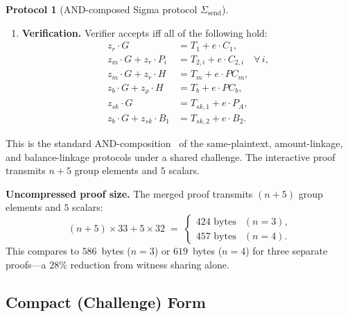 \documentclass[11pt]{article}
\theoremstyle{definition}
\newtheorem{protocol}[theorem]{Protocol}
\newcommand{\sk}{\mathit{sk}}
\begin{document}
\begin{protocol}[AND-composed Sigma protocol $\Sigma_{\mathrm{send}}$]
\begin{enumerate}
    \item \textbf{Verification.}
          Verifier accepts iff all of the following hold:
          \begin{align}
            z_r \cdot G
              &= T_1 + e \cdot C_1,
              \label{eq:ver-t1} \\
            z_m \cdot G + z_r \cdot P_i
              &= T_{2,i} + e \cdot C_{2,i}
              \quad \forall\, i,
              \label{eq:ver-t2} \\
            z_m \cdot G + z_r \cdot H
              &= T_m + e \cdot \mathit{PC}_m,
              \label{eq:ver-tm} \\
            z_b \cdot G + z_\rho \cdot H
              &= T_b + e \cdot \mathit{PC}_b,
              \label{eq:ver-tb} \\
            z_{\sk} \cdot G
              &= T_{\sk,1} + e \cdot P_A,
              \label{eq:ver-tsk1} \\
            z_b \cdot G + z_{\sk} \cdot B_1
              &= T_{\sk,2} + e \cdot B_2.
              \label{eq:ver-tsk2}
          \end{align}
  \end{enumerate}
\end{protocol}

This is the standard AND-composition~\cite{CramerDamgardSchoenmakers1994}
of the same-plaintext, amount-linkage, and balance-linkage protocols
under a shared challenge.
The interactive proof transmits $n + 5$ group elements and $5$ scalars.

\medskip
\noindent\textbf{Uncompressed proof size.}
The merged proof transmits $(n + 5)$ group elements and $5$ scalars:
\[
  (n + 5) \times 33 + 5 \times 32 \;=\;
  \begin{cases}
    424 \text{~bytes} & (n = 3), \\
    457 \text{~bytes} & (n = 4).
  \end{cases}
\]
This compares to $586$~bytes ($n = 3$) or $619$~bytes ($n = 4$) for
three separate proofs---a $28\%$ reduction from witness sharing alone.

\subsection{Compact (Challenge) Form}
\label{sec:compact}
\end{document}
